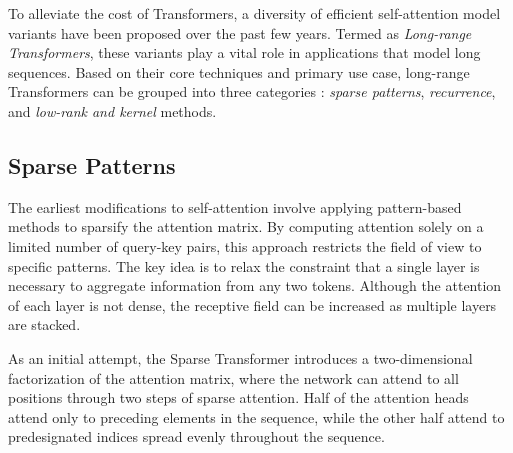 To alleviate the cost of Transformers, a diversity of efficient self-attention model variants \citep{tay2020efficient} have been proposed over the past few years. Termed as \textit{Long-range Transformers}, these variants play a vital role in applications that model long sequences. Based on their core techniques and primary use case, long-range Transformers can be grouped into three categories \citep{qin2022nlp}: \textit{sparse patterns}, \textit{recurrence}, and \textit{low-rank and kernel} methods. 



\subsection{Sparse Patterns}
\label{subsubsection:related-long-range-modeling-sparse}

The earliest modifications to self-attention involve applying pattern-based methods to sparsify the attention matrix. By computing attention solely on a limited number of query-key pairs, this approach restricts the field of view to specific patterns.
The key idea is to relax the constraint that a single layer is necessary to aggregate information from any two tokens. Although the attention of each layer is not dense, the receptive field can be increased as multiple layers are stacked. 

As an initial attempt, the Sparse Transformer \citep{child2019generating} introduces a two-dimensional factorization of the attention matrix, where the network can attend to all positions through two steps of sparse attention. Half of the attention heads attend only to preceding elements in the sequence, while the other half attend to predesignated indices spread evenly throughout the sequence. 

